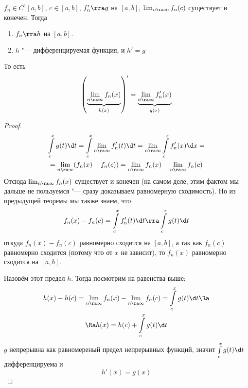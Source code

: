 \begin{theorem}
	$f_n \in C^1[a, b]$, $c \in [a, b]$, $f_n' \rra g$ на $[a, b]$, $\lim_{n \ra \infty} f_n(c)$ существует и конечен.
	Тогда
	\begin{enumerate}
		\item $f_n \rra h$ на $[a, b]$.
		\item $h$ "--- дифференцируемая функция, и $h' = g$
	\end{enumerate}
	То есть
	\[ \left(\underbrace{\lim_{n \ra \infty} f_n(x)}_{h(x)}\right)' = \underbrace{\lim_{n \ra \infty} f_n'(x)}_{g(x)} \]
\end{theorem}
\begin{proof}
	\begin{gather*}
		\int\limits_c^x g(t) \d t = \int\limits_c^x \lim_{n \ra \infty} f_n'(t) \d t = \lim_{n \ra \infty} \int\limits_c^x f_n'(x) \d x = \\
		= \lim_{n \ra \infty} (f_n(x) - f_n(c)) = \lim_{n \ra \infty} f_n(x) - \lim_{n \ra \infty} f_n(c)
	\end{gather*}
	Отсюда $\lim_{n \ra \infty} f_n(x)$ существует и конечен
	(на самом деле, этим фактом мы дальше не пользуемся "--- сразу доказываем равномерную сходимость).
	Но из предыдущей теоремы мы также знаем, что
	\[ f_n(x) - f_n(c) = \int\limits_c^x f_n'(t) \d t \rra \int\limits_c^x g(t) \d t \]
	откуда $f_n(x) - f_n(c)$ равномерно сходится на $[a, b]$, а так как $f_n(c)$ равномерно сходится (потому что от $x$ не зависит), то
	$f_n(x)$ равномерно сходится на $[a, b]$.

	Назовём этот предел $h$.
	Тогда посмотрим на равенства выше:
	\begin{gather*}
		h(x) - h(c) = \lim_{n \ra \infty} f_n(x) - \lim_{n \ra \infty} f_n(c) = \int\limits_c^x g(t) \d t \Ra \\
		\Ra h(x) = h(c) + \int\limits_c^x g(t) \d t
	\end{gather*}
	$g$ непрерывна как равномереный предел непрерывных функций, значит $\int\limits_c^x g(t) \d t$ дифференцируема и
	\[ h'(x) = g(x) \]
\end{proof}

